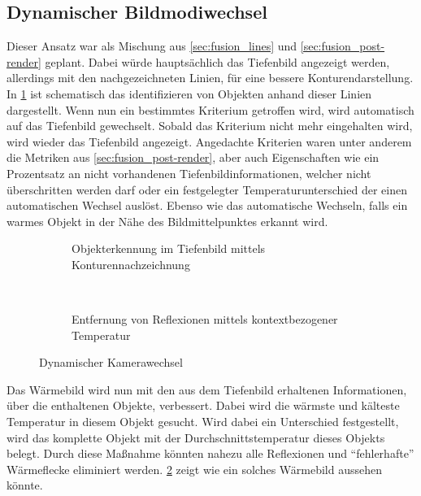\subsection{Dynamischer Bildmodiwechsel}
Dieser Ansatz war als Mischung aus \cref{sec:fusion_lines} und \cref{sec:fusion_post-render} geplant.
Dabei würde hauptsächlich das Tiefenbild angezeigt werden, allerdings mit den nachgezeichneten Linien, für eine bessere Konturendarstellung.
In \cref{fig:fusion_dyn_depth} ist schematisch das identifizieren von Objekten anhand dieser Linien dargestellt.
Wenn nun ein bestimmtes Kriterium getroffen wird, wird automatisch auf das Tiefenbild gewechselt.
Sobald das Kriterium nicht mehr eingehalten wird, wird wieder das Tiefenbild angezeigt.
Angedachte Kriterien waren unter anderem die Metriken aus \cref{sec:fusion_post-render}, aber auch Eigenschaften wie ein Prozentsatz an nicht vorhandenen Tiefenbildinformationen, welcher nicht überschritten werden darf oder ein festgelegter Temperaturunterschied der einen automatischen Wechsel auslöst.
Ebenso wie das automatische Wechseln, falls ein warmes Objekt in der Nähe des Bildmittelpunktes erkannt wird.
\begin{figure}[H]
	\centering
	\begin{subfigure}[t]{0.45\textwidth}
		\centering
		\caption{Objekterkennung im Tiefenbild mittels Konturennachzeichnung}
		\label{fig:fusion_dyn_depth}
	\end{subfigure}
	~
	\begin{subfigure}[t]{0.45\textwidth}
		\centering
		\caption{Entfernung von Reflexionen mittels kontextbezogener Temperatur}
		\label{fig:fusion_dyn_heat}
	\end{subfigure}
	\caption{Dynamischer Kamerawechsel}
	\label{fig:fusion_dyn}
\end{figure}

Das Wärmebild wird nun mit den aus dem Tiefenbild erhaltenen Informationen, über die enthaltenen Objekte, verbessert.
Dabei wird die wärmste und kälteste Temperatur in diesem Objekt gesucht.
Wird dabei ein Unterschied festgestellt, wird das komplette Objekt mit der Durchschnittstemperatur dieses Objekts belegt.
Durch diese Maßnahme könnten nahezu alle Reflexionen und \enquote{fehlerhafte} Wärmeflecke eliminiert werden.
\cref{fig:fusion_dyn_heat} zeigt wie ein solches Wärmebild aussehen könnte.


